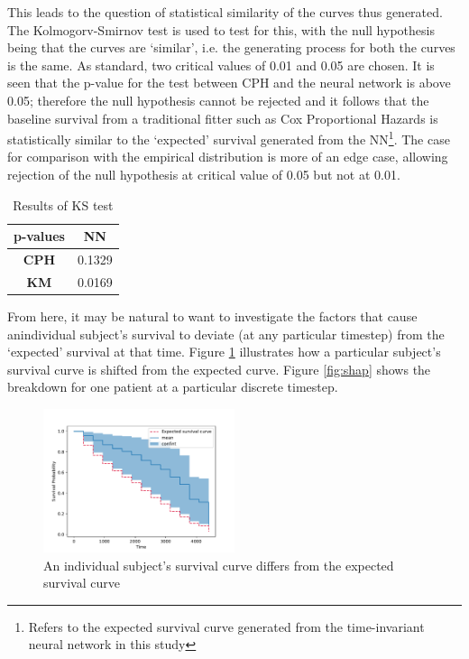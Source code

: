 \documentclass[%
 twocolumn,
 reprint,
 amsmath,amssymb,
 aps,nofootinbib
]{revtex4-2}
\begin{document}
This leads to the question of statistical similarity of the curves thus generated. The Kolmogorv-Smirnov test \cite{ks_test_lilliefors} is used to test for this, with the null hypothesis being that the curves are `similar', i.e. the generating process for both the curves is the same. As standard, two critical values of 0.01 and 0.05 are chosen. It is seen that the p-value for the test between CPH and the neural network is above 0.05; therefore the null hypothesis cannot be rejected and it follows that the baseline survival from a traditional fitter such as Cox Proportional Hazards is statistically similar to the `expected' survival generated from the NN\footnote{Refers to the expected survival curve generated from the time-invariant neural network in this study}. The case for comparison with the empirical distribution is more of an edge case, allowing rejection of the null hypothesis at critical value of 0.05 but not at 0.01.\\

\begin{table}
  \centering
  \begin{tabular}{|c|c|}
  \hline
  \textbf{p-values}&\textbf{NN}\\
  \hline
  \textbf{CPH}&0.1329\\
  \hline
  \textbf{KM}&0.0169\\
  \hline
  \end{tabular}
  \caption[KS test]{Results of KS test}
  \label{tab:kstest}
\end{table}

From here, it may be natural to want to investigate the factors that cause anindividual subject's survival to deviate (at any particular timestep) from the `expected' survival at that time. Figure \ref{fig:diff_exp_curve} illustrates how a particular subject's survival curve is shifted from the expected curve. Figure \ref{fig:shap} shows the breakdown for one patient at a particular discrete timestep. \\


\begin{figure}
  \centering
  \includegraphics[width=0.5\textwidth]{diff_exp_curve.pdf}
  \caption[Survival difference]{An individual subject's survival curve differs from the expected survival curve}
  \label{fig:diff_exp_curve}
\end{figure}
\end{document}

